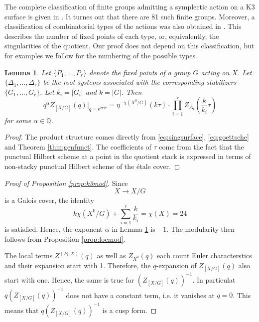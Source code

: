 \documentclass[11pt,a4paper]{amsart}
\newtheorem{lemma}[theorem]{Lemma}
\theoremstyle{definition}
\begin{document}
The complete classification of finite groups admitting a symplectic action on a K3 surface is given in \cite{mukai1988finite}. It turnes out that there are 81 such finite groups. Moreover, a classification of combinatorial types of the actions was also obtained in \cite{xiao1996galois}. This describes the number of fixed points of each type, or, equivalently, the singularities of the quotient. Our proof does not depend on this classification, but for examples we follow \cite[Table 2]{xiao1996galois} for the numbering of the possible types. 

\begin{lemma}
\label{lem:powerstr}
Let $\{P_1,\dots,P_r\}$ denote the fixed points of a group $G$ acting on $X$. Let $\{ \Delta_1, \dots, \Delta_r \}$ be the  root systems associated with the corresponding stabilizers $\{ G_1,\dots,G_r \}$. Let $k_i=|G_i|$ and $k=|G|$. Then 
\[ q^{\alpha} Z_{[X/G]}(q)\Big|_{q=\mathrm{e}^{2 \pi i \tau}}= \eta^{-\chi(X^0/G)}(k \tau) \cdot \prod_{i=1}^r Z_{\Delta_i}\left(\frac{k}{k_i} \tau\right) \]
for some $\alpha \in \mathbb{Q}$.
\end{lemma}
\begin{proof} The product structure comes directly from \eqref{eq:singsurface}, \eqref{eq:goettsche} and Theorem \ref{thm:genfunct}.
The coefficients of $\tau$ come from the fact that the punctual Hilbert scheme at a point in the quotient stack is expressed in terms of non-stacky punctual Hilbert scheme of the \'etale cover.
\end{proof}

\begin{proof}[{Proof of Proposition \ref{prop:k3mod}}] %
Since 
\[ X \to X/G \]
is a Galois cover, the identity
\begin{equation} k\chi(X^0/G)+\sum_{i=1}^r \frac{k}{k_i}=\chi(X)=24 
\label{eq:modint}
\end{equation}
is satisfied. Hence, the exponent $\alpha$ in Lemma \ref{lem:powerstr} is $-1$. The modularity then follows from Proposition \ref{prop:locmod}.

The local terms $Z^{(P_i, X)}(q)$ as well as $Z_{X^0}(q)$ each count Euler characterstics and their expansion start with 1. Therefore, the $q$-expansion of $Z_{[X/G]}(q)$ also start with one. Hence, the same is true for $(Z_{[X/G]}(q))^{-1}$. In particulat $q(Z_{[X/G]}(q))^{-1}$ does not have a constant term, i.e. it vanishes at $q=0$. This means that $q(Z_{[X/G]}(q))^{-1}$ is a cusp form.
\end{proof}
\end{document}
